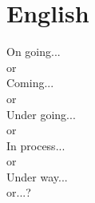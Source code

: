 \section{English}
\noindent On going...\\
or\\
Coming...\\
or\\
Under going...\\
or\\
In process...\\
or\\
Under way...\\
or...?